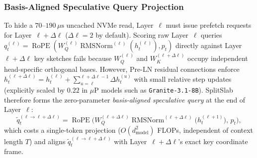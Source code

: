 \documentclass[10pt,journal,compsoc]{IEEEtran}
\theoremstyle{definition}
\theoremstyle{remark}
\newcommand{\SplitSlab}{\textup{\textsc{SplitSlab}}}
\newcommand{\RMSNorm}{\operatorname{RMSNorm}}
\newcommand{\RoPE}{\operatorname{RoPE}}
\def\SplitSlab{SplitSlab}%
\begin{document}
\subsubsection{Basis-Aligned Speculative Query Projection}
To hide a $70$--$190\,\mu\mathrm{s}$ uncached NVMe read, Layer~$\ell$ must issue prefetch requests for Layer~$\ell + \Delta\ell$ ($\Delta\ell = 2$ by default). Scoring raw Layer~$\ell$ queries $q_t^{(\ell)} = \RoPE(W_Q^{(\ell)}\RMSNorm^{(\ell)}(h_t^{(\ell)}), p_t)$ directly against Layer~$\ell+\Delta\ell$ key sketches fails because $W_Q^{(\ell)}$ and $W_K^{(\ell+\Delta\ell)}$ occupy independent head-specific orthogonal bases. However, Pre-LN residual connections enforce $h_t^{(\ell+\Delta\ell)} = h_t^{(\ell)} + \sum_{u=\ell}^{\ell+\Delta\ell-1} \Delta h_t^{(u)}$ with small relative step updates (explicitly scaled by $0.22$ in $\mu\text{P}$ models such as \texttt{Granite-3.1-8B}). \SplitSlab{} therefore forms the zero-parameter \emph{basis-aligned speculative query} at the end of Layer~$\ell$:
\begin{equation}\label{eq:spec_query}
\tilde{q}_t^{(\ell \to \ell+\Delta\ell)} = \RoPE\!\Big(W_Q^{(\ell+\Delta\ell)} \RMSNorm^{(\ell+\Delta\ell)}\!\big(h_t^{(\ell+1)}\big),\, p_t\Big),
\end{equation}
which costs a single-token projection ($O(d_{\mathrm{model}}^2)$ FLOPs, independent of context length $T$) and aligns $\tilde{q}_t^{(\ell \to \ell+\Delta\ell)}$ with Layer~$\ell+\Delta\ell$'s exact key coordinate frame.
\end{document}
